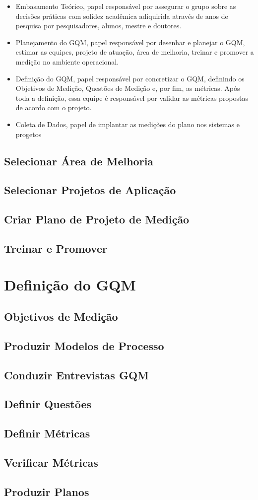 \begin{itemize}
  \item Embasamento Teórico, papel responsável por assegurar o grupo sobre as decisões
  práticas com solidez acadêmica adiquirida através de anos de pesquisa por pesquisadores,
  alunos, mestre e doutores.

  \item Planejamento do GQM, papel responsável por desenhar e planejar o GQM, estimar
  as equipes, projeto de atuação, área de melhoria, treinar e promover a medição
  no ambiente operacional.

  \item Definição do GQM, papel responsável por concretizar o GQM, definindo os
  Objetivos de Medição, Questões de Medição e, por fim, as métricas. Após toda a
  definição, essa equipe é responsável por validar as métricas propostas de acordo
  com o projeto.

  \item Coleta de Dados, papel de implantar as medições do plano nos sistemas e
  progetos
\end{itemize}

\subsection{Selecionar Área de Melhoria}
\subsection{Selecionar Projetos de Aplicação}
\subsection{Criar Plano de Projeto de Medição}
\subsection{Treinar e Promover}

\section{Definição do GQM}
\subsection{Objetivos de Medição}
\subsection{Produzir Modelos de Processo}
\subsection{Conduzir Entrevistas GQM}
\subsection{Definir Questões}
\subsection{Definir Métricas}
\subsection{Verificar Métricas}
\subsection{Produzir Planos}
